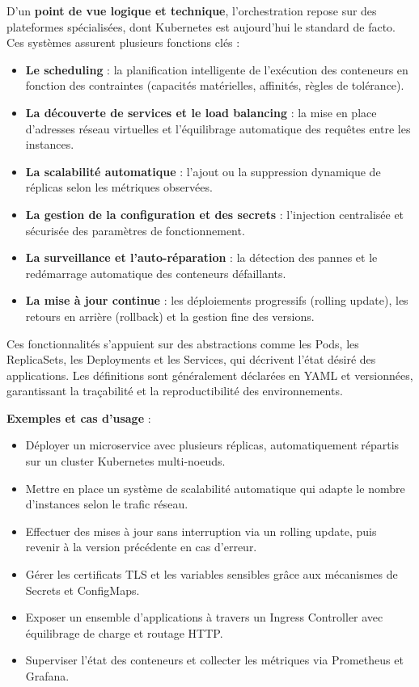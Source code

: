 D’un \textbf{point de vue logique et technique}, l’orchestration repose sur des plateformes spécialisées, dont Kubernetes est aujourd’hui le standard de facto. Ces systèmes assurent plusieurs fonctions clés :
\begin{itemize}
	\item \textbf{Le scheduling} : la planification intelligente de l’exécution des conteneurs en fonction des contraintes (capacités matérielles, affinités, règles de tolérance).
	\item \textbf{La découverte de services et le load balancing} : la mise en place d’adresses réseau virtuelles et l’équilibrage automatique des requêtes entre les instances.
	\item \textbf{La scalabilité automatique} : l’ajout ou la suppression dynamique de réplicas selon les métriques observées.
	\item \textbf{La gestion de la configuration et des secrets} : l’injection centralisée et sécurisée des paramètres de fonctionnement.
	\item \textbf{La surveillance et l’auto-réparation} : la détection des pannes et le redémarrage automatique des conteneurs défaillants.
	\item \textbf{La mise à jour continue} : les déploiements progressifs (rolling update), les retours en arrière (rollback) et la gestion fine des versions.
\end{itemize}

Ces fonctionnalités s’appuient sur des abstractions comme les Pods, les ReplicaSets, les Deployments et les Services, qui décrivent l’état désiré des applications. Les définitions sont généralement déclarées en YAML et versionnées, garantissant la traçabilité et la reproductibilité des environnements.

\textbf{Exemples et cas d’usage} :
\begin{itemize}
	\item Déployer un microservice avec plusieurs réplicas, automatiquement répartis sur un cluster Kubernetes multi-noeuds.
	\item Mettre en place un système de scalabilité automatique qui adapte le nombre d’instances selon le trafic réseau.
	\item Effectuer des mises à jour sans interruption via un rolling update, puis revenir à la version précédente en cas d’erreur.
	\item Gérer les certificats TLS et les variables sensibles grâce aux mécanismes de Secrets et ConfigMaps.
	\item Exposer un ensemble d’applications à travers un Ingress Controller avec équilibrage de charge et routage HTTP.
	\item Superviser l’état des conteneurs et collecter les métriques via Prometheus et Grafana.
\end{itemize}

